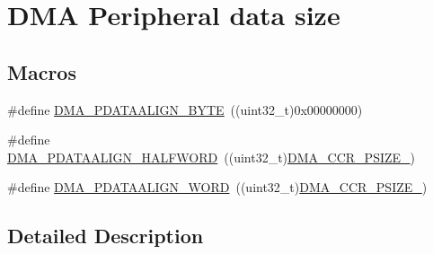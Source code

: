 \hypertarget{group___d_m_a___peripheral__data__size}{\section{D\-M\-A Peripheral data size}
\label{group___d_m_a___peripheral__data__size}
}
\subsection*{Macros}
\begin{DoxyCompactItemize}
\item 
\#define \hyperlink{group___d_m_a___peripheral__data__size_ga55b8c8f5ec95f10d26d6c5b1c9136730}{D\-M\-A\-\_\-\-P\-D\-A\-T\-A\-A\-L\-I\-G\-N\-\_\-\-B\-Y\-T\-E}~((uint32\-\_\-t)0x00000000)
\item 
\#define \hyperlink{group___d_m_a___peripheral__data__size_gac08bfd907442dba5358830b247135bcc}{D\-M\-A\-\_\-\-P\-D\-A\-T\-A\-A\-L\-I\-G\-N\-\_\-\-H\-A\-L\-F\-W\-O\-R\-D}~((uint32\-\_\-t)\hyperlink{group___peripheral___registers___bits___definition_ga4b3726c7d0fd3b00e33637f163c79128}{D\-M\-A\-\_\-\-C\-C\-R\-\_\-\-P\-S\-I\-Z\-E\-\_})
\item 
\#define \hyperlink{group___d_m_a___peripheral__data__size_gaad50e97cbc4a726660db9c3f42ac93b0}{D\-M\-A\-\_\-\-P\-D\-A\-T\-A\-A\-L\-I\-G\-N\-\_\-\-W\-O\-R\-D}~((uint32\-\_\-t)\hyperlink{group___peripheral___registers___bits___definition_ga8e8d8786f16dda2bef035ba2df15b69d}{D\-M\-A\-\_\-\-C\-C\-R\-\_\-\-P\-S\-I\-Z\-E\-\_})
\end{DoxyCompactItemize}


\subsection{Detailed Description}


